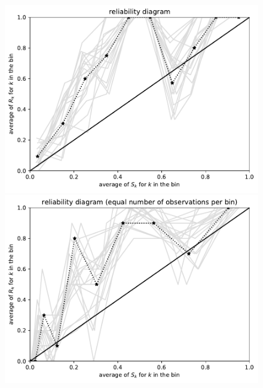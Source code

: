\documentclass{article}
\begin{document}
\begin{figure}
\begin{centering}
\vspace{\vertsep}

\parbox{\imsize}{\includegraphics[width=\imsize]
                {./codes/unweighted/100_10_1_2/equiprob.pdf}}
\quad\quad
\parbox{\imsize}{\includegraphics[width=\imsize]
                {./codes/unweighted/100_10_1_2/equisamp.pdf}}

\vspace{\vertsep}


\end{centering}
\end{figure}
\end{document}
